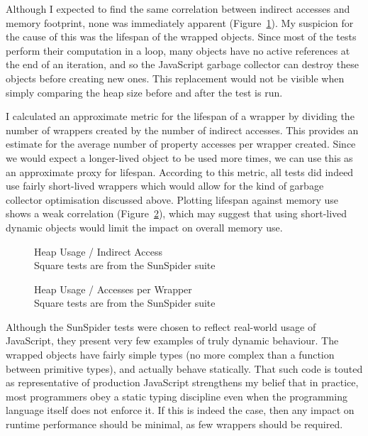 \documentclass[12pt,a4paper,twoside,openright]{report}
\theoremstyle{definition}
\theoremstyle{dotless}
\begin{document}
Although I expected to find the same correlation between indirect accesses and
memory footprint, none was immediately apparent (Figure~\ref{fig:mem1}). My
suspicion for the cause of this was the lifespan of the wrapped objects. Since
most of the tests perform their computation in a loop, many objects have no active references
at the end of an iteration, and so the JavaScript garbage
collector can destroy these objects before creating new ones. This replacement
would not be visible when simply comparing the heap size before and after the test
is run. 

I calculated an approximate metric for the lifespan of a wrapper by dividing
the number of wrappers created by the number of indirect accesses.  This
provides an estimate for the average number of property accesses per wrapper
created. Since we would expect a longer-lived object to be used more times, we
can use this as an approximate proxy for lifespan. According to this metric,
all tests did indeed use fairly short-lived wrappers which would allow for the
kind of garbage collector optimisation discussed above. Plotting lifespan
against memory use shows a weak correlation (Figure~\ref{fig:mem2}), which may
suggest that using short-lived dynamic objects would limit the impact on
overall memory use.

\begin{figure}[H]

  \caption{Heap Usage / Indirect Access\\ \footnotesize{Square tests are from the SunSpider suite}}
  \label{fig:mem1}
\end{figure}
\begin{figure}[H]
  \caption{Heap Usage / Accesses per Wrapper\\ \footnotesize{Square tests are from the SunSpider suite}}
  \label{fig:mem2}
\end{figure}
Although the SunSpider tests were chosen to reflect real-world usage of
JavaScript, they present very few examples of truly dynamic behaviour.
The wrapped objects have fairly simple types (no 
more complex than a function between primitive types), and actually behave 
statically. That such code is touted as representative of
production JavaScript strengthens my belief that in practice, most programmers obey a 
static typing discipline even when the programming language itself does not enforce it.
If this is indeed the case, then any impact on runtime performance should be minimal,
as few wrappers should be required.
\end{document}
